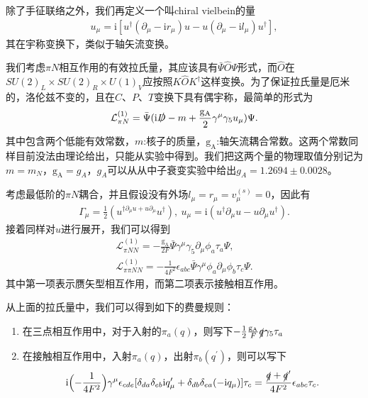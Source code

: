 \documentclass[aps,tightenlines,16pt]{ctexart}
\numberwithin{equation}{section}
\newcommand{\mL}{\mathcal{L}}
\begin{document}
除了手征联络之外，我们再定义一个叫chiral vielbein的量
\begin{align}
   u_{\mu}=\mbox{i}[u^{\dagger}(\partial_{\mu}-\mbox{i}r_{\mu})u-u(\partial_{\mu}-\mbox{i}l_{\mu})u^{\dagger}],
\end{align}
其在宇称变换下，类似于轴矢流变换。

我们考虑$\pi N$相互作用的有效拉氏量，其应该具有$\bar{\Psi}\hat{O}\Psi$形式，而$\hat{O}$在$SU(2)_L\times SU(2)_R \times U(1)_V$应按照$K\hat{O}K^{\dagger}$这样变换。为了保证拉氏量是厄米的，洛伦兹不变的，且在$C\text{、}P\text{、}T$变换下具有偶宇称，最简单的形式为
\begin{align}
   \mL_{\pi N}^{(1)} = \bar{\Psi}(\mbox{i}\slashed{D}-m+\frac{\mathrm{g_A}}{2}\gamma^{\mu}\gamma_5u_{\mu})\Psi.
\end{align}
其中包含两个低能有效常数，$m$:核子的质量，$\mathrm{g_A}$:轴矢流耦合常数。这两个常数同样目前没法由理论给出，只能从实验中得到。{\color{blue}我们把这两个量的物理取值分别记为$m=m_N$，$\mathrm{g_A}=g_A$，$g_A$可以从从中子衰变实验中给出$g_A=1.2694\pm 0.0028$。}

考虑最低阶的$\pi N$耦合，并且假设没有外场$l_{\mu}=r_{\mu}=v_{\mu}^{(s)}=0$，因此有
\begin{align}
   \Gamma_{\mu}=\frac{1}{2}(u^{\dagger\partial_{\mu}u+u\partial_{\mu}}u^{\dagger}),\ u_{\mu}=\mbox{i}(u^{\dagger}\partial_{\mu}u-u\partial_{\mu}u^{\dagger}).
\end{align}
接着同样对$u$进行展开，我们可以得到
\begin{align}
   \mL_{\pi N N}^{(1)}=-\frac{\mathrm{g_A}}{2F}\bar{\Psi}\gamma^{\mu}\gamma_5\partial_{\mu}\phi_a\tau_a \Psi,\\
   \mL_{\pi\pi N N}^{(1)}=-\frac{1}{4F^2}\epsilon_{abc}\bar{\Psi}\gamma^{\mu}\phi_a\partial_{\mu}\phi_b\tau_c \Psi.
\end{align}
其中第一项表示赝矢型相互作用，而第二项表示接触相互作用。

从上面的拉氏量中，我们可以得到如下的费曼规则：
\begin{enumerate}
   \item 在三点相互作用中，对于入射的$\pi_a(q)$，则写下$-\frac{1}{2}\frac{\mathrm{g_A}}{F}\slashed{q}\gamma_5\tau_a$
   \item 在接触相互作用中，入射$\pi_a(q)$，出射$\pi_b(q^{\prime})$，则可以写下
   \begin{align}
      \mbox{i}\Bigl(-\frac{1}{4F^2}\Bigr)\gamma^{\mu}\epsilon_{cde}[\delta_{da}\delta_{eb}\mbox{i}q^{\prime}_{\mu}+\delta_{db}\delta_{ea}(-\mbox{i}q_{\mu})]\tau_c = \frac{\slashed{q}+\slashed{q}^{\prime}}{4F^2}\epsilon_{abc}\tau_c.
   \end{align}
\end{enumerate}
\end{document}
